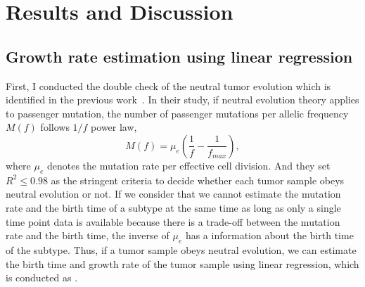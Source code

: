 \documentclass{article}
\begin{document}
\section{Results and Discussion}
\subsection{Growth rate estimation using linear regression}

First, I conducted the double check of the neutral tumor evolution which is identified in the previous work~\cite{williams2016identification}.
In their study, if neutral evolution theory applies to passenger mutation, the number of passenger mutations per allelic frequency $M(f)$ follows $1/f$ power law,
\begin{equation}
 M(f) = \mu_e \left( \frac{1}{f} - \frac{1}{f_{max}}\right),\label{neutral_evolution}
\end{equation}
where $\mu_e$ denotes the mutation rate per effective cell division.
And they set $R^2 \leq 0.98$ as the stringent criteria to decide whether each tumor sample obeys neutral evolution or not.
If we consider that we cannot estimate the mutation rate and the birth time of a subtype at the same time as long as only a single time point data is available
because there is a trade-off between the mutation rate and the birth time, the inverse of $\mu_e$ has a information about the birth time of the subtype.
Thus, if a tumor sample obeys neutral evolution, we can estimate the birth time and growth rate of the tumor sample using linear regression, which is conducted as .
\end{document}
